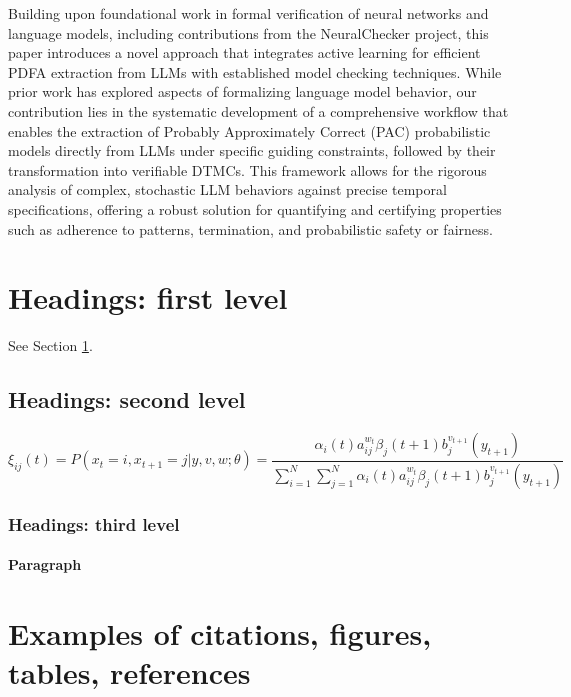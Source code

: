\documentclass{article}
\begin{document}
Building upon foundational work in formal verification of neural networks and language models, including contributions from the NeuralChecker project, this paper introduces a novel approach that integrates active learning for efficient PDFA extraction from LLMs with established model checking techniques. While prior work has explored aspects of formalizing language model behavior, our contribution lies in the systematic development of a comprehensive workflow that enables the extraction of Probably Approximately Correct (PAC) probabilistic models directly from LLMs under specific guiding constraints, followed by their transformation into verifiable DTMCs. This framework allows for the rigorous analysis of complex, stochastic LLM behaviors against precise temporal specifications, offering a robust solution for quantifying and certifying properties such as adherence to patterns, termination, and probabilistic safety or fairness.


\section{Headings: first level}
\label{sec:headings}

\lipsum[4] See Section \ref{sec:headings}.

\subsection{Headings: second level}
\lipsum[5]
\begin{equation}
	\xi _{ij}(t)=P(x_{t}=i,x_{t+1}=j|y,v,w;\theta)= {\frac {\alpha _{i}(t)a^{w_t}_{ij}\beta _{j}(t+1)b^{v_{t+1}}_{j}(y_{t+1})}{\sum _{i=1}^{N} \sum _{j=1}^{N} \alpha _{i}(t)a^{w_t}_{ij}\beta _{j}(t+1)b^{v_{t+1}}_{j}(y_{t+1})}}
\end{equation}

\subsubsection{Headings: third level}
\lipsum[6]

\paragraph{Paragraph}
\lipsum[7]



\section{Examples of citations, figures, tables, references}
\label{sec:others}
\end{document}
